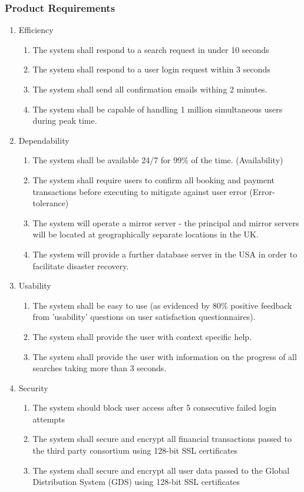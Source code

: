 \subsubsection{Product Requirements}
\begin{enumerate}
	\item Efficiency

		\begin{enumerate}
			\item The system shall respond to a search request in under 10 seconds
			\item The system shall respond to a user login request within 3 seconds
			\item The system shall send all confirmation emails withing 2 minutes.
			\item The system shall be capable of handling 1 million simultaneous users
				during peak time.
		\end{enumerate}
	\item Dependability

		\begin{enumerate}
			\item The system shall be available 24/7 for 99\% of the time. (Availability)
			\item The system shall require users to confirm all booking and payment
				transactions before executing to mitigate against user error (Error-tolerance)
			\item The system will operate a mirror server - the principal and mirror
				servers will be located at geographically separate locations in the
				UK.
			\item The system will provide a further database server in the USA in order
				to facilitate disaster recovery.
		\end{enumerate}
	\item Usability

		\begin{enumerate}
			\item The system shall be easy to use (as evidenced by 80\% positive feedback
				from 'usability' questions on user satisfaction questionnaires).
			\item The system shall provide the user with context specific help.
			\item The system shall provide the user with information on the progress
				of all searches taking more than 3 seconds.
		\end{enumerate}
	\item Security

		\begin{enumerate}
			\item The system should block user access after 5 consecutive failed login
				attempts
			\item The system shall secure and encrypt all financial transactions passed
				to the third party consortium using 128-bit SSL certificates
			\item The system shall secure and encrypt all user data passed to the Global
				Distribution System (GDS) using 128-bit SSL certificates
		\end{enumerate}
\end{enumerate}

